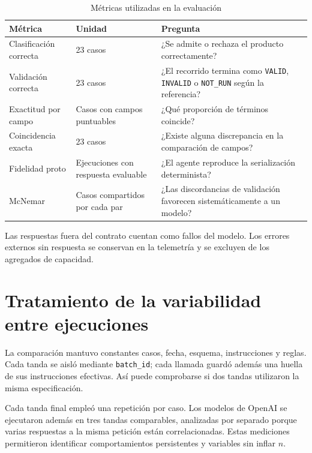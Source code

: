 \begin{table}[H]
\centering
\small
\caption{Métricas utilizadas en la evaluación}
\label{tab:metricas_evaluacion}
\begin{tabular}{|P{3.0cm}|P{3.4cm}|P{6.8cm}|}
\hline
\textbf{Métrica} & \textbf{Unidad} & \textbf{Pregunta} \\
\hline
Clasificación correcta & 23 casos & ¿Se admite o rechaza el producto correctamente? \\
\hline
Validación correcta & 23 casos & ¿El recorrido termina como \texttt{VALID}, \texttt{INVALID} o \texttt{NOT\_RUN} según la referencia? \\
\hline
Exactitud por campo & Casos con campos puntuables & ¿Qué proporción de términos coincide? \\
\hline
Coincidencia exacta & 23 casos & ¿Existe alguna discrepancia en la comparación de campos? \\
\hline
Fidelidad proto & Ejecuciones con respuesta evaluable & ¿El agente reproduce la serialización determinista? \\
\hline
McNemar & Casos compartidos por cada par & ¿Las discordancias de validación favorecen sistemáticamente a un modelo? \\
\hline
\end{tabular}
\end{table}

Las respuestas fuera del contrato cuentan como fallos del modelo. Los errores externos sin respuesta se conservan en la telemetría y se excluyen de los agregados de capacidad.

\section{Tratamiento de la variabilidad entre ejecuciones}
\label{sec:variabilidad_ejecuciones}

La comparación mantuvo constantes casos, fecha, esquema, instrucciones y reglas. Cada tanda se aisló mediante \texttt{batch\_id}; cada llamada guardó además una huella de sus instrucciones efectivas. Así puede comprobarse si dos tandas utilizaron la misma especificación.

Cada tanda final empleó una repetición por caso. Los modelos de OpenAI se ejecutaron además en tres tandas comparables, analizadas por separado porque varias respuestas a la misma petición están correlacionadas. Estas mediciones permitieron identificar comportamientos persistentes y variables sin inflar \(n\).

